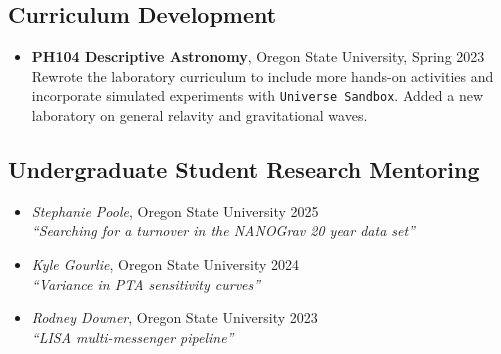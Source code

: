 \documentclass[11pt,letterpaper,sans,unicode]{moderncv}
\newcommand{\studentitem}[4]{\item \textit{#1}, {#2} \hfill{#3} \\ \textit{``#4''} } %
\newcommand{\blucirc}{{\color{color1} $\circ\;\;$}}
\begin{document}
{\subsection{Curriculum Development}
	\renewcommand\labelitemi{\blucirc}
	\begin{itemize}[leftmargin=8mm]
	\setlength\itemsep{1mm}
	\item \textbf{\color{color1} PH104 Descriptive Astronomy}, Oregon State University, \hfill Spring 2023
        		\newline  Rewrote the laboratory curriculum to include more hands-on activities
				\newline and incorporate simulated experiments with \texttt{Universe Sandbox}.
				\newline Added a new laboratory on general relavity and gravitational waves.
	\end{itemize}





\subsection{Undergraduate Student Research Mentoring}
\renewcommand\labelitemi{\blucirc}
\begin{itemize}[leftmargin=8mm]
	\studentitem{Stephanie Poole}{Oregon State University}{2025}{Searching for a turnover in the NANOGrav 20 year data set}
	\studentitem{Kyle Gourlie}{Oregon State University}{2024}{Variance in PTA sensitivity curves}
	\studentitem{Rodney Downer}{Oregon State University}{2023}{LISA multi-messenger pipeline}
\end{itemize}

}
\end{document}
